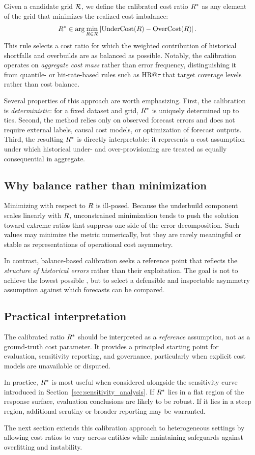 Given a candidate grid $\mathcal{R}$, we define the calibrated cost ratio $R^{\ast}$ as
any element of the grid that minimizes the realized cost imbalance:
\[
    R^{\ast} \in  \arg\min_{R \in \mathcal{R}}\left|\mathrm{UnderCost}(R) - \mathrm{OverCost}(R)\right| .
\]
This rule selects a cost ratio for which the weighted contribution of historical
shortfalls and overbuilds are as balanced as possible.
Notably, the calibration operates on \emph{aggregate cost mass} rather than error
frequency, distinguishing it from quantile- or hit-rate-based rules such as
HR@$\tau$ that target coverage levels rather than cost balance.

Several properties of this approach are worth emphasizing.
First, the calibration is \emph{deterministic}: for a fixed dataset and grid,
$R^{\ast}$ is uniquely determined up to ties.
Second, the method relies only on observed forecast errors and does not require
external labels, causal cost models, or optimization of forecast outputs.
Third, the resulting $R^{\ast}$ is directly interpretable: it represents a cost
assumption under which historical under- and over-provisioning are treated as
equally consequential in aggregate.

\subsection{Why balance rather than minimization}
\label{subsec:why_balance}

Minimizing \CWSL{} with respect to $R{}$ is ill-posed.
Because the underbuild component scales linearly with $R{}$, unconstrained
minimization tends to push the solution toward extreme ratios that suppress one
side of the error decomposition.
Such values may minimize the metric numerically, but they are rarely meaningful
or stable as representations of operational cost asymmetry.

In contrast, balance-based calibration seeks a reference point that reflects the
\emph{structure of historical errors} rather than their exploitation.
The goal is not to achieve the lowest possible \CWSL{}, but to select a defensible
and inspectable asymmetry assumption against which forecasts can be compared.

\subsection{Practical interpretation}
\label{subsec:practical_interpretation}

The calibrated ratio $R^{\ast}$ should be interpreted as a \emph{reference}
assumption, not as a ground-truth cost parameter.
It provides a principled starting point for evaluation, sensitivity reporting,
and governance, particularly when explicit cost models are unavailable or
disputed.

In practice, $R^{\ast}$ is most useful when considered alongside the sensitivity
curve introduced in Section~\ref{sec:sensitivity_analysis}.
If $R^{\ast}$ lies in a flat region of the response surface, evaluation conclusions
are likely to be robust.
If it lies in a steep region, additional scrutiny or broader reporting may be
warranted.

The next section extends this calibration approach to heterogeneous settings by
allowing cost ratios to vary across entities while maintaining safeguards
against overfitting and instability.
